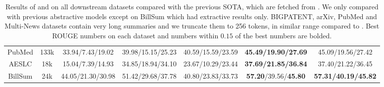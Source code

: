 \begin{table}[tb]
\begin{minipage}{\textwidth}
\begin{tabular}{cc|ccc|cc}
    PubMed          & 133k  & 33.94/7.43/19.02  & 39.98/15.15/25.23 & 40.59/15.59/23.59 & \textbf{45.49/19.90/27.69} & 45.09/19.56/27.42 \\ 
    AESLC           & 18k   & 15.04/7.39/14.93  & 34.85/18.94/34.10 & 23.67/10.29/23.44 & \textbf{37.69/21.85/36.84} & 37.40/21.22/36.45 \\
    BillSum         & 24k   & 44.05/21.30/30.98 & 51.42/29.68/37.78 & 40.80/23.83/33.73 & \textbf{57.20}/39.56/\textbf{45.80} & \textbf{57.31/40.19/45.82} \\ \hline 
  \end{tabular}
  \end{minipage}
  \caption{Results of \pegasuslarge and \pegasusbase on all downstream datasets compared with the previous SOTA, which are fetched from \cite{lewis2019bart,shi-etal-2019-leafnats,fabbri-etal-2019-multinews,koupaee2018wikihow,kim-etal-2019-reddittifu,subramanian2019extractive,song2019mass,zhang-tetreault-2019-aeslc,kornilova-eidelman-2019-billsum}. We only compared with previous abstractive models except on BillSum which had extractive results only. BIGPATENT, arXiv, PubMed and Multi-News datasets contain very long summaries and we truncate them to 256 tokens, in similar range compared to   \citep{sharma-etal-2019-bigpatent,cohan-etal-2018-discourse-scientificpapers,fabbri-etal-2019-multinews, goodman2019multistage}. Best ROUGE numbers on each dataset and numbers within $0.15$ of the best numbers are bolded.}
  \label{tab:large_model}
\end{table}

